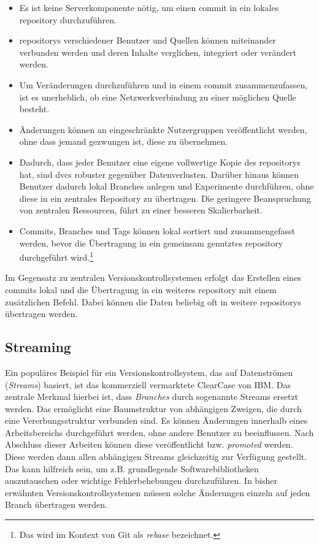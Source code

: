 \begin{itemize}
\item Es ist keine Serverkomponente nötig, um einen \gls{commit} in ein lokales
\gls{repository} durchzuführen.
\item \glspl{repository} verschiedener Benutzer und Quellen können miteinander
verbunden werden und deren Inhalte verglichen, integriert oder verändert werden.
\item Um Veränderungen durchzuführen und in einem \gls{commit} zusammenzufassen,
ist es unerheblich, ob eine Netzwerkverbindung zu einer möglichen Quelle besteht.
\item Änderungen können an eingeschränkte Nutzergruppen veröffentlicht werden,
ohne dass jemand gezwungen ist, diese zu übernehmen.
\item Dadurch, dass jeder Benutzer eine eigene vollwertige Kopie des
\glspl{repository} hat, sind \acrshort{dvcs} robuster gegenüber Datenverlusten.
Darüber hinaus können Benutzer dadurch lokal Branches anlegen und Experimente
durchführen, ohne diese in ein zentrales Repository zu übertragen. Die
geringere Beanspruchung von zentralen Ressourcen, führt zu einer besseren
Skalierbarkeit.
\item Commits, Branches und Tags können lokal sortiert und zusammengefasst
werden, bevor die Übertragung in ein gemeinsam genutztes \gls{repository}
durchgeführt wird.\footnote{Das wird im Kontext von Git als \textit{rebase}
bezeichnet.}
\end{itemize}
Im Gegensatz zu zentralen Versionskontrollsystemen erfolgt das Erstellen eines
\glspl{commit} lokal und die Übertragung in ein weiteres \gls{repository} mit
einem zusätzlichen Befehl. Dabei können die Daten beliebig oft in weitere
\glspl{repository} übertragen werden.

\subsection{Streaming}\label{sec:streaming}
Ein populäres Beispiel für ein Versionskontrollsystem, das auf Datenströmen
(\textit{Streams}) basiert, ist das kommerziell vermarktete ClearCase von IBM.
Das zentrale Merkmal hierbei ist, dass \textit{Branches} durch sogenannte
Streams ersetzt werden. Das ermöglicht eine Baumstruktur von abhängigen
Zweigen, die durch eine Vererbungsstruktur verbunden sind. Es können Änderungen
innerhalb eines Arbeitsbereichs durchgeführt werden, ohne andere Benutzer zu
beeinflussen. Nach Abschluss dieser Arbeiten können diese veröffentlicht bzw.
\textit{promoted} werden. Diese werden dann allen abhängigen Streams
gleichzeitig zur Verfügung gestellt. Das kann hilfreich sein, um z.B.
grundlegende Softwarebibliotheken auszutauschen oder wichtige Fehlerbehebungen
durchzuführen. In bisher erwähnten Versionskontrollsystemen müssen solche
Änderungen einzeln auf jeden Branch übertragen werden.
